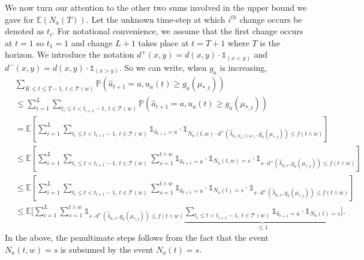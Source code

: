 \documentclass[letterpaper]{article} %
\newcommand{\ind}{\mathds{1}}
\newcommand{\bE}{\mathds{E}}
\newcommand{\ArmAt}{\hat{a}}
\newcommand{\IsEqual}{=}
\newcommand{\optMean}[1]{\mu_{*, #1}}
\newcommand{\noChange}{\mathcal{T}}
\newcommand{\timeOfChange}[1]{t_{#1}}
\newcommand{\windowsize}{w}
\begin{document}
We now turn our attention to the other two sums involved in the upper bound we gave for $\mathds{E}(N_a(T))$. Let the unknown time-step at which $i^{th}$ change occurs be denoted as $\timeOfChange{i}$. For notational convenience, we assume that the first change occurs at $t=1$ so $\timeOfChange{1} = 1$ and change $L+1$  takes place at $t= T+1$ where $T$ is the horizon.
We introduce the notation $d^+(x,y) = d(x,y) \cdot \ind_{(x<y)}$ and $d^-(x,y) = d(x,y) \cdot \ind_{(x>y)}$. So we can write, when $g_a$ is increasing,
\begin{align*}
 & \sum_{K \leq t \leq T-1, \ t \in \noChange(\windowsize)} \mathds{P}\left(\ArmAt_{t+1} \IsEqual a, u_a(t) \geq g_a(\optMean{t})\right) \\
&\leq  \sum_{i=1}^{L} \sum_{\timeOfChange{i}  \leq t  < \timeOfChange{i+1}-1, \  t \in \noChange(\windowsize)}
 \mathds{P}\left(\ArmAt_{t+1} \IsEqual a, u_a(t) \geq g_a(\optMean{t})\right) \\ 
 &= \bE\left[\sum_{i=1}^{L} \sum_{\timeOfChange{i}  \leq t  < \timeOfChange{i+1}-1, \  t \in \noChange(\windowsize)} \ind_{\ArmAt_{t+1} \IsEqual a} \cdot \ind_{N_a(t, w) \cdot d^+(\hat{\lambda}_{a,N_a(t, w)},g_a(\optMean{t})) \leq f(t \wedge \windowsize )}\right]  \\
 &\leq \bE\left[ \sum_{i=1}^{L} \sum_{\timeOfChange{i}  \leq t  < \timeOfChange{i+1}-1, \  t \in \noChange(\windowsize)} \sum_{s=1}^{t \wedge \windowsize} \ind_{\ArmAt_{t+1} \IsEqual a} \cdot \ind_{N_a(t, \windowsize) \IsEqual s} \cdot \ind_{s \cdot d^+(\hat{\lambda}_{a,s},g_a(\optMean{t})) \leq f(t \wedge \windowsize )} \right] \\
&\leq \bE\left[ \sum_{i=1}^{L} \sum_{\timeOfChange{i}  \leq t  < \timeOfChange{i+1}-1, \  t \in \noChange(\windowsize)} \sum_{s=1}^{t \wedge \windowsize} \ind_{\ArmAt_{t+1} \IsEqual a} \cdot \ind_{N_a(t) \IsEqual s} \cdot \ind_{s \cdot d^+(\hat{\lambda}_{a,s},g_a(\optMean{t})) \leq f(t \wedge \windowsize )} \right] \\
 &\leq \bE\Big[ \sum_{i=1}^{L}  \sum_{s=1}^{t \wedge \windowsize}  \ind_{s \cdot d^+(\hat{\lambda}_{a,s},g_a(\optMean{t})) \leq f(t \wedge \windowsize )} \underbrace{\sum_{\timeOfChange{i}  \leq t  < \timeOfChange{i+1}-1, \  t \in \noChange(\windowsize)} \ind_{\ArmAt_{t+1} \IsEqual a} \cdot \ind_{N_a(t) \IsEqual s}}_{\leq 1}   \Big]. \end{align*}
In the above, the penultimate steps follows from the fact that the event $N_a(t, \windowsize) = s$ is subsumed by the event $N_a(t) = s$.
\end{document}
